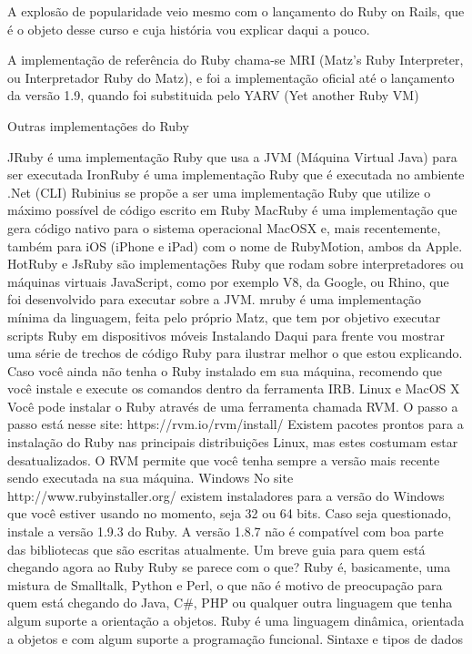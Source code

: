 \documentclass[12pt]{book} %
\begin{document}
A explosão de popularidade veio mesmo com o lançamento do Ruby on Rails, que é o objeto desse curso e cuja história vou explicar daqui a pouco.

A implementação de referência do Ruby chama-se MRI (Matz’s Ruby Interpreter, ou Interpretador Ruby do Matz), e foi a implementação oficial até o lançamento da versão 1.9, quando foi substituida pelo YARV (Yet another Ruby VM)

Outras implementações do Ruby

JRuby é uma implementação Ruby que usa a JVM (Máquina Virtual Java) para ser executada
IronRuby é uma implementação Ruby que é executada no ambiente .Net (CLI)
Rubinius se propõe a ser uma implementação Ruby que utilize o máximo possível de código escrito em Ruby
MacRuby é uma implementação que gera código nativo para o sistema operacional MacOSX e, mais recentemente, também para iOS (iPhone e iPad) com o nome de RubyMotion, ambos da Apple.
HotRuby e JsRuby são implementações Ruby que rodam sobre interpretadores ou máquinas virtuais JavaScript, como por exemplo V8, da Google, ou Rhino, que foi desenvolvido para executar sobre a JVM.
mruby é uma implementação mínima da linguagem, feita pelo próprio Matz, que tem por objetivo executar scripts Ruby em dispositivos móveis
Instalando
Daqui para frente vou mostrar uma série de trechos de código Ruby para ilustrar melhor o que estou explicando. Caso você ainda não tenha o Ruby instalado em sua máquina, recomendo que você instale e execute os comandos dentro da ferramenta IRB.
Linux e MacOS X
Você pode instalar o Ruby através de uma ferramenta chamada RVM. O passo a passo está nesse site: https://rvm.io/rvm/install/
Existem pacotes prontos para a instalação do Ruby nas principais distribuições Linux, mas estes costumam estar desatualizados. O RVM permite que você tenha sempre a versão mais recente sendo executada na sua máquina.
Windows
No site http://www.rubyinstaller.org/ existem instaladores para a versão do Windows que você estiver usando no momento, seja 32 ou 64 bits. Caso seja questionado, instale a versão 1.9.3 do Ruby. A versão 1.8.7 não é compatível com boa parte das bibliotecas que são escritas atualmente.
Um breve guia para quem está chegando agora ao Ruby
Ruby se parece com o que?
Ruby é, basicamente, uma mistura de Smalltalk, Python e Perl, o que não é motivo de preocupação para quem está chegando do Java, C\#, PHP ou qualquer outra linguagem que tenha algum suporte a orientação a objetos.
Ruby é uma linguagem dinâmica, orientada a objetos e com algum suporte a programação funcional.
Sintaxe e tipos de dados
\end{document}
